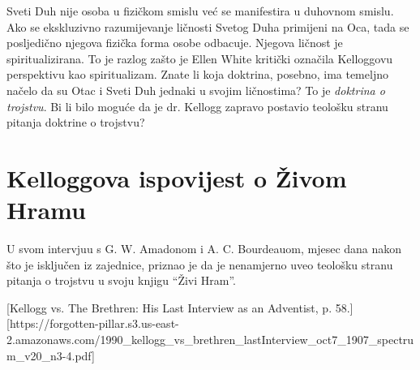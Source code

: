 Sveti Duh nije osoba u fizičkom smislu već se manifestira u duhovnom smislu. Ako se ekskluzivno razumijevanje ličnosti Svetog Duha primijeni na Oca, tada se posljedično njegova fizička forma osobe odbacuje. Njegova ličnost je spiritualizirana. To je razlog zašto je Ellen White kritički označila Kelloggovu perspektivu kao spiritualizam. Znate li koja doktrina, posebno, ima temeljno načelo da su Otac i Sveti Duh jednaki u svojim ličnostima? To je \textit{doktrina o trojstvu}. Bi li bilo moguće da je dr. Kellogg zapravo postavio teološku stranu pitanja doktrine o trojstvu?

\section*{Kelloggova ispovijest o Živom Hramu}

U svom intervjuu s G. W. Amadonom i A. C. Bourdeauom, mjesec dana nakon što je isključen iz zajednice, priznao je da je nenamjerno uveo teološku stranu pitanja o trojstvu u svoju knjigu “Živi Hram”.

[Kellogg vs. The Brethren: His Last Interview as an Adventist, p. 58.][https://forgotten-pillar.s3.us-east-2.amazonaws.com/1990\_kellogg\_vs\_brethren\_lastInterview\_oct7\_1907\_spectrum\_v20\_n3-4.pdf]


